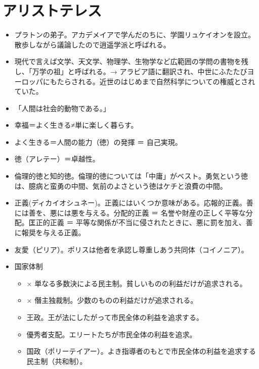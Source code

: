 \documentclass[uplatex,dvipdfmx]{jsarticle} \usepackage{mystyle}%
\begin{document}
\section{アリストテレス}
\begin{itemize}
\item プラトンの弟子。アカデメイアで学んだのちに、学園リュケイオンを設立。散歩しながら議論したので逍遥学派と呼ばれる。
\item 現代で言えば文学、天文学、物理学、生物学など広範囲の学問の書物を残し、「万学の祖」と呼ばれる。→ アラビア語に翻訳され、中世にふたたびヨーロッパにもたらされる。近世のはじめまで自然科学についての権威とされていた。
\item 「人間は社会的動物である。」
\item 幸福＝よく生きる≠単に楽しく暮らす。
\item よく生きる＝人間の能力（徳）の発揮 ＝ 自己実現。
\item 徳（アレテー）＝卓越性。
\item 倫理的徳と知的徳。倫理的徳については「中庸」がベスト。勇気という徳は、臆病と蛮勇の中間、気前のよさという徳はケチと浪費の中間。
\item 正義(ディカイオシュネー)。正義にはいくつか意味がある。応報的正義。善には善を、悪には悪を与える。分配的正義 ＝ 名誉や財産の正しく平等な分配。匡正的正義 ＝ 平等な関係が不当に侵されたときに、悪に罰を加え、善に報奨を与える正義。
\item 友愛（ピリア）。ポリスは他者を承認し尊重しあう共同体（コイノニア）。

\item 国家体制
  \begin{itemize}
  \item × 単なる多数決による民主制。貧しいものの利益だけが追求される。
  \item × 僭主独裁制。少数のものの利益だけが追求される。
  \item 王政。王が法にしたがって市民全体の利益を追求する。
  \item 優秀者支配。エリートたちが市民全体の利益を追求。
  \item 国政（ポリーテイアー）。よき指導者のもとで市民全体の利益を追求する民主制（共和制）。
  \end{itemize}
\end{itemize}


\fi
\ifx\mybook\undefined


\end{document}
